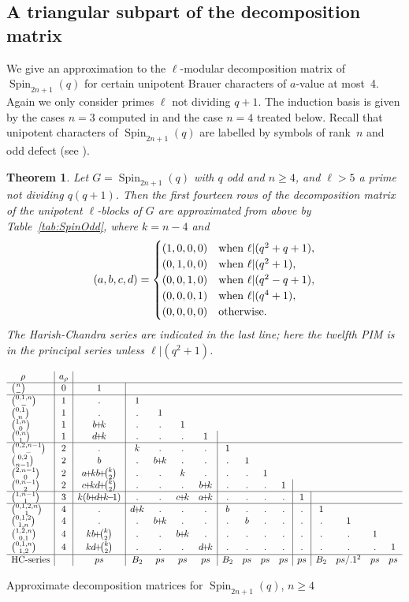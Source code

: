 \documentclass[12pt,leqno,a4paper]{amsart}
\newcommand{\Spin}{{\operatorname{Spin}}}
\newcommand{\pl}{{\!+\!}}
\newcommand{\mn}{{\!-\!}}
\newtheorem{thm}{Theorem}[section]
\theoremstyle{remark}
\begin{document}
\subsection{A triangular subpart of the decomposition matrix}
We give an approximation to the $\ell$-modular decomposition matrix of
$\Spin_{2n+1}(q)$ for certain unipotent Brauer characters of $a$-value at
most~4. Again we only consider primes $\ell$ not dividing $q+1$. The induction
basis is given by the cases $n=3$ computed in \cite{HN14} and the case $n=4$
treated below. Recall that unipotent characters of $\Spin_{2n+1}(q)$ are
labelled by symbols of rank~$n$ and odd defect (see \cite[\S13.8]{Ca}).

\begin{thm}   \label{thm:decB}
 Let $G=\Spin_{2n+1}(q)$ with $q$ odd and $n\ge4$, and $\ell>5$ a prime not
 dividing $q(q+1)$. Then the first fourteen rows of the decomposition matrix of
 the unipotent $\ell$-blocks of $G$ are approximated from above by
 Table~\ref{tab:SpinOdd}, where $k=n-4$ and
 $$(a,b,c,d)=\begin{cases}
                           (1,0,0,0)& \text{when $\ell|(q^2+q+1)$},\cr
                           (0,1,0,0)& \text{when $\ell|(q^2+1)$},\cr
                           (0,0,1,0)& \text{when $\ell|(q^2-q+1)$},\cr
                           (0,0,0,1)& \text{when $\ell|(q^4+1)$},\cr
                           (0,0,0,0)& \text{otherwise}.\cr
 \end{cases}$$
 The Harish-Chandra series are indicated in the last line; here the twelfth
 PIM is in the principal series unless $\ell|(q^2+1)$.
\end{thm}

\begin{table}[htbp]
{\small\[\begin{array}{l|c|c|cccc|cccc|c|cccc}
  \quad\rho& a_\rho\cr
\hline
    \binom{n}{-}& 0& 1\cr
\hline
\binom{0,1,n}{-}& 1& .& 1\cr
  \binom{0,1}{n}& 1& .& .& 1\cr
  \binom{1,n}{0}& 1& b\pl k& .& .& 1\cr
  \binom{0,n}{1}& 1& d\pl k& .& .& .& 1\cr
\hline
\binom{0,2,n-1}{-}& 2& .& k& .& .& .& 1\cr
  \binom{0,2}{n-1}& 2& b& .& b\pl k& .& .& .& 1\cr
  \binom{2,n-1}{0}& 2& a\pl kb\pl \binom{k}{2}& .& .& k& .& .& .& 1\cr
  \binom{0,n-1}{2}& 2& c\pl kd\pl \binom{k}{2}& .& .& .& b\pl k& .& .& .& 1\cr
\hline
  \binom{1,n-1}{1}& 3& k(b\pl d\pl k\mn1)& .& .& c\pl k& a\pl k& .& .& .& .& 1\cr
\hline
\binom{0,1,2,n}{1}& 4& .& d\pl k& .& .& .& b& .& .& .& .& 1\cr
\binom{0,1,2}{1,n}& 4& .& .& b\pl k& .& .& .& b& .& .& .& .& 1\cr
\binom{1,2,n}{0,1}& 4& kb\pl \binom{k}{2}& .& .& b\pl k& .& .& .& .& .& .& .& .& 1\cr
\binom{0,1,n}{1,2}& 4& kd\pl \binom{k}{2}& .& .& .& d\pl k& .& .& .& .& .& .& .& .& 1\cr
\hline
 \text{HC-series}& & ps& B_2& ps& ps& ps& B_2& ps& ps& ps& ps& B_2& ps/.1^2& ps& ps\cr
\end{array}\]}
\caption{Approximate decomposition matrices for $\Spin_{2n+1}(q)$, $n\ge4$}   \label {tab:SpinOdd}
\end{table}
\end{document}
